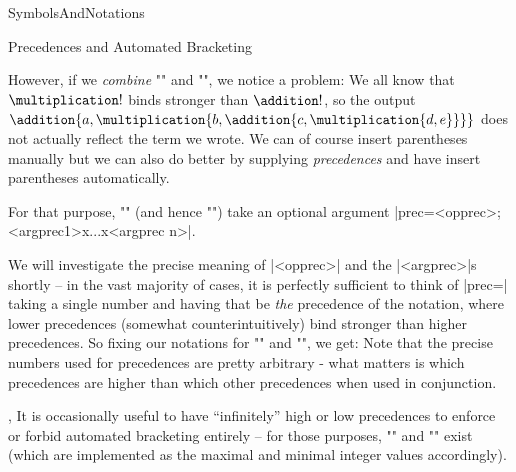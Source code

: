 \begin{smodule}[ns=https://github.com/slatex/sTeX/doc]{SymbolsAndNotations}
\begin{sfragment}{Precedences and Automated Bracketing}

    However, if we \emph{combine} \stexcode"\addition" and
    \stexcode"\multiplication", we notice a problem:
    We all know that $\multiplication!$ binds stronger than $\addition!$,
    so the output $\addition{a,\multiplication{b,\addition{c,\multiplication{d,e}}}}$
    does not actually reflect the term we wrote. We can of course
    insert parentheses manually
    but we can also do better by supplying \emph{precedences} and
    have \sTeX insert parentheses automatically.

    For that purpose, \stexcode"\notation" (and hence \stexcode"\symdef")
    take an optional argument |prec=<opprec>;<argprec1>x...x<argprec n>|.

    We will investigate the precise meaning of |<opprec>| and the
    |<argprec>|s shortly -- in the vast majority of cases, it is
    perfectly sufficient to think of |prec=| taking a single number
    and having that be \emph{the} precedence of the notation,
    where lower precedences 
    (somewhat counterintuitively) bind stronger than higher precedences.
    So fixing our notations for \stexcode"\addition" and
    \stexcode"\multiplication", we get:
    Note that the precise numbers used for precedences are pretty
    arbitrary - what matters is which precedences are higher than
    which other precedences when used in conjunction.
    \begin{variable}{\infprec,\neginfprec}
        It is occasionally useful to have ``infinitely'' high
        or low precedences to enforce or forbid
        automated bracketing entirely -- for those purposes,
        \stexcode"\infprec"
        and \stexcode"\neginfprec" exist (which are implemented
        as the maximal and minimal integer values accordingly).
    \end{variable}


\end{sfragment}
\end{smodule}
